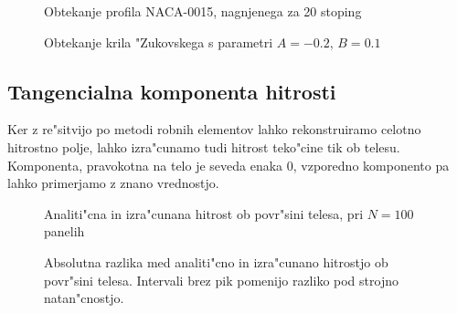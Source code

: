 \documentclass[a4paper,10pt]{article}
\begin{document}
\begin{figure}[H]
 \subfigure{}
 \subfigure{}
 \caption{Obtekanje profila NACA-0015, nagnjenega za 20 stoping}
 \label{fig:naca-r}
\end{figure}

\begin{figure}[H]
 \subfigure{}
 \subfigure{}
 \caption{Obtekanje krila "Zukovskega s parametri $A=-0.2$, $B = 0.1$}
 \label{fig:zukovski}
\end{figure}

\subsection{Tangencialna komponenta hitrosti}

Ker z re"sitvijo po metodi robnih elementov lahko rekonstruiramo celotno hitrostno polje, lahko izra"cunamo tudi hitrost teko"cine tik ob telesu. Komponenta, pravokotna na telo je seveda enaka 0, vzporedno komponento pa lahko primerjamo z znano vrednostjo. 

\begin{figure}[H]

\caption{Analiti"cna in izra"cunana hitrost ob povr"sini telesa, pri $N=100$ panelih}
\label{fig:tangencialna}
\end{figure}

\begin{figure}[H]

\caption{Absolutna razlika med analiti"cno in izra"cunano hitrostjo ob povr"sini telesa. Intervali brez pik pomenijo razliko pod strojno  natan"cnostjo. }
\label{fig:tangencialna-log}
\end{figure}
\end{document}
